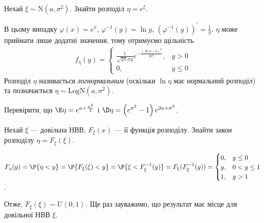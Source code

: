 \begin{example}
    Нехай $\xi \sim \mathrm{N}(a, \sigma^2)$. Знайти розподіл $\eta = e^\xi$.

    В цьому випадку $\varphi(x) = e^x$, $\varphi^{-1}(y) = \ln y$, $\left(\varphi^{-1} (y)\right)^{\prime} = \frac{1}{y}$.
    $\eta$ може приймати лише додатні значення, тому отримуємо щільність
    \begin{gather*}
        f_\eta(y) = \begin{cases}
            \frac{1}{\sqrt{2\pi}\sigma y} e^{-\frac{(\ln y-a)^2}{2\sigma^2}}, & y > 0 \\
            0, & y \leq 0
        \end{cases}
    \end{gather*}
    Розподіл $\eta$ називається \emph{логнормальним} (оскільки $\ln \eta$ має нормальний розподіл)
    та позначається $\eta \sim \mathrm{LogN}(a, \sigma^2)$.
\end{example}
\begin{exercise}
    Перевірити, що $\E\eta = e^{a + \frac{\sigma^2}{2}}$ і
    $\D\eta = \left(e^{\sigma^2} - 1\right) e^{2a + \sigma^2}$.
\end{exercise}

\begin{example}
    Нехай $\xi$ --- довільна НВВ, $F_\xi (x)$ --- її функція розподілу. 
    Знайти закон розподілу $\eta = F_\xi (\xi)$.

    \noindent $F_\eta (y) = \P\{\eta < y\} = \P\{F_\xi(\xi) < y\} = \P\{\xi < F_\xi^{-1}(y)\} = F_\xi(F_\xi^{-1}(y)) = \begin{cases}
        0, & y \leq 0 \\
        y, & 0 < y \leq 1 \\
        1, & y > 1
    \end{cases}$.

    \noindent Отже, $F_\xi (\xi) \sim U\left<0;1\right>$. Ще раз зауважимо, що результат має місце для довільної НВВ $\xi$.
\end{example}

